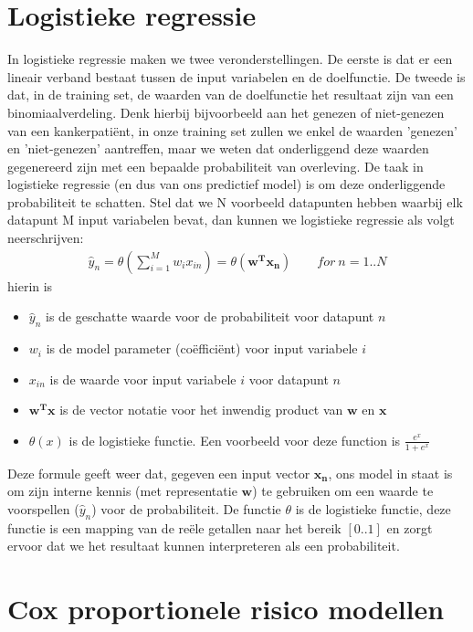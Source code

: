 \section{Logistieke regressie}
\label{subsec:D:glm-linear-regression}
In logistieke regressie maken we twee veronderstellingen. De eerste is dat er een lineair verband bestaat tussen de input variabelen en de doelfunctie. De tweede is dat, in de training set, de waarden van de doelfunctie het resultaat zijn van een binomiaalverdeling. Denk hierbij bijvoorbeeld aan het genezen of niet-genezen van een kankerpati\"ent, in onze training set zullen we enkel de waarden 'genezen' en 'niet-genezen' aantreffen, maar we weten dat onderliggend deze waarden gegenereerd zijn met een bepaalde probabiliteit van overleving. De taak in logistieke regressie (en dus van ons predictief model) is om deze onderliggende probabiliteit te schatten. Stel dat we N voorbeeld datapunten hebben waarbij elk datapunt M input variabelen bevat, dan kunnen we logistieke regressie als volgt neerschrijven:
\begin{equation}
\begin{split}
\hat{y}_{n} = \theta(\sum_{i=1}^{M}w_{i}x_{in})= \theta(\bm{w^{T}x_{n}}) \qquad for\ n=1..N
\end{split}
\end{equation}
hierin is
\begin{itemize}
	\item $\hat{y}_{n}$ is de geschatte waarde voor de probabiliteit voor datapunt $n$
	\item $w_{i}$ is de model parameter (co\"effici\"ent) voor input variabele $i$
	\item $x_{in}$ is de waarde voor input variabele $i$ voor datapunt $n$
	\item $\bm{w^{T}x}$ is de vector notatie voor het inwendig product van $\bm{w}$ en $\bm{x}$
	\item $\theta(x)$ is de logistieke functie. Een voorbeeld voor deze function is $\frac{e^{x}}{1+e^{x}}$
\end{itemize}
Deze formule geeft weer dat, gegeven een input vector $\bm{x_{n}}$, ons model in staat is om zijn interne kennis (met representatie $\bm{w}$) te gebruiken om een waarde te voorspellen ($\hat{y}_{n}$) voor de probabiliteit. De functie $\theta$ is de logistieke functie, deze functie is een mapping van de re\"ele getallen naar het bereik $[0..1]$ en zorgt ervoor dat we het resultaat kunnen interpreteren als een probabiliteit.

\section{Cox proportionele risico modellen}



